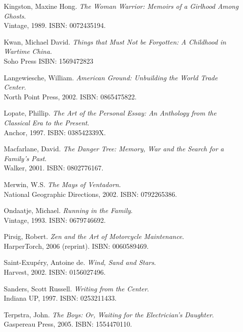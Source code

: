 \documentclass[letterpaper,oneside]{report}
\begin{document}
\begin{itemize}
\item [Kingston, Maxine Hong.] \textit{The Woman Warrior: Memoirs of a Girlhood Among Ghosts}. \\Vintage, 1989. \textsc{ISBN: 0072435194}.

\item [Kwan, Michael David.] \textit{Things that Must Not be Forgotten: A Childhood in Wartime China.} \\Soho Press \textsc{ISBN: 1569472823}

\item [Langewiesche, William.] \textit{American Ground: Unbuilding the World Trade Center}. \\North Point Press, 2002. \textsc{ISBN: 0865475822}.

\item [Lopate, Phillip.] \textit{The Art of the Personal Essay: An Anthology from the Classical Era to the Present}. \\Anchor, 1997. \textsc{ISBN: 038542339X}.

\item [Macfarlane, David.] \textit{The Danger Tree: Memory, War and the Search for a Family's Past}. \\Walker, 2001. \textsc{ISBN: 0802776167}.

\item [Merwin, W.S.] \textit{The Mays of Ventadorn}. \\National Geographic Directions, 2002. \textsc{ISBN: 0792265386}.

\item [Ondaatje, Michael.] \textit{Running in the Family}. \\Vintage, 1993. \textsc{ISBN: 0679746692}.

\item [Pirsig, Robert.] \textit{Zen and the Art of Motorcycle Maintenance}. \\HarperTorch, 2006 (reprint). \textsc{ISBN: 0060589469}.

\item [Saint-Exup\'ery, Antoine de.] \textit{Wind, Sand and Stars}. \\Harvest, 2002. \textsc{ISBN: 0156027496}.

\item [Sanders, Scott Russell.] \textit{Writing from the Center}. \\Indiana UP, 1997. \textsc{ISBN: 0253211433}.

\item [Terpstra, John.] \textit{The Boys: Or, Waiting for the Electrician's Daughter}. \\Gaspereau Press, 2005. \textsc{ISBN: 1554470110}.
\end{itemize}
\end{document}
